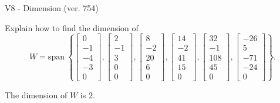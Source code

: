 \begin{exercise}
  \begin{exerciseTitle}V8 - Dimension (ver. 754)\end{exerciseTitle}
  \begin{exerciseStatement}
    Explain how to find the dimension of 
\[W=\mathrm{span}\ \left\{\left[\begin{array}{r}
0 \\
-1 \\
-4 \\
-3 \\
0
\end{array}\right] , \left[\begin{array}{r}
2 \\
-1 \\
3 \\
0 \\
0
\end{array}\right] , \left[\begin{array}{r}
8 \\
-2 \\
20 \\
6 \\
0
\end{array}\right] , \left[\begin{array}{r}
14 \\
-2 \\
41 \\
15 \\
0
\end{array}\right] , \left[\begin{array}{r}
32 \\
-1 \\
108 \\
45 \\
0
\end{array}\right] , \left[\begin{array}{r}
-26 \\
5 \\
-71 \\
-24 \\
0
\end{array}\right]\right\}.\]



  \end{exerciseStatement}
  \begin{exerciseAnswer}
   The dimension of \(W\) is  \(2\).
  


  \end{exerciseAnswer}
\end{exercise}